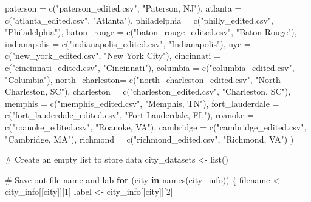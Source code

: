\documentclass[
  letterpaper,
  DIV=11,
  numbers=noendperiod]{scrartcl}
\newenvironment{Shaded}{\begin{snugshade}}{\end{snugshade}}
\newcommand{\AttributeTok}[1]{\textcolor[rgb]{0.40,0.45,0.13}{#1}}
\newcommand{\CommentTok}[1]{\textcolor[rgb]{0.37,0.37,0.37}{#1}}
\newcommand{\ControlFlowTok}[1]{\textcolor[rgb]{0.00,0.23,0.31}{\textbf{#1}}}
\newcommand{\DecValTok}[1]{\textcolor[rgb]{0.68,0.00,0.00}{#1}}
\newcommand{\FunctionTok}[1]{\textcolor[rgb]{0.28,0.35,0.67}{#1}}
\newcommand{\NormalTok}[1]{\textcolor[rgb]{0.00,0.23,0.31}{#1}}
\newcommand{\OtherTok}[1]{\textcolor[rgb]{0.00,0.23,0.31}{#1}}
\newcommand{\StringTok}[1]{\textcolor[rgb]{0.13,0.47,0.30}{#1}}
\begin{document}
\begin{Shaded}
\begin{Highlighting}[]
  \AttributeTok{paterson        =} \FunctionTok{c}\NormalTok{(}\StringTok{"paterson\_edited.csv"}\NormalTok{, }\StringTok{"Paterson, NJ"}\NormalTok{),}
  \AttributeTok{atlanta         =} \FunctionTok{c}\NormalTok{(}\StringTok{"atlanta\_edited.csv"}\NormalTok{, }\StringTok{"Atlanta"}\NormalTok{),}
  \AttributeTok{philadelphia    =} \FunctionTok{c}\NormalTok{(}\StringTok{"philly\_edited.csv"}\NormalTok{, }\StringTok{"Philadelphia"}\NormalTok{),}
  \AttributeTok{baton\_rouge     =} \FunctionTok{c}\NormalTok{(}\StringTok{"baton\_rouge\_edited.csv"}\NormalTok{, }\StringTok{"Baton Rouge"}\NormalTok{),}
  \AttributeTok{indianapolis    =} \FunctionTok{c}\NormalTok{(}\StringTok{"indianapolis\_edited.csv"}\NormalTok{, }\StringTok{"Indianapolis"}\NormalTok{),}
  \AttributeTok{nyc             =} \FunctionTok{c}\NormalTok{(}\StringTok{"new\_york\_edited.csv"}\NormalTok{, }\StringTok{"New York City"}\NormalTok{),}
  \AttributeTok{cincinnati      =} \FunctionTok{c}\NormalTok{(}\StringTok{"cincinnati\_edited.csv"}\NormalTok{, }\StringTok{"Cincinnati"}\NormalTok{),}
  \AttributeTok{columbia        =} \FunctionTok{c}\NormalTok{(}\StringTok{"columbia\_edited.csv"}\NormalTok{, }\StringTok{"Columbia"}\NormalTok{),}
  \AttributeTok{north\_charleston=} \FunctionTok{c}\NormalTok{(}\StringTok{"north\_charleston\_edited.csv"}\NormalTok{, }\StringTok{"North Charleston, SC"}\NormalTok{),}
  \AttributeTok{charleston      =} \FunctionTok{c}\NormalTok{(}\StringTok{"charleston\_edited.csv"}\NormalTok{, }\StringTok{"Charleston, SC"}\NormalTok{),}
  \AttributeTok{memphis         =} \FunctionTok{c}\NormalTok{(}\StringTok{"memphis\_edited.csv"}\NormalTok{, }\StringTok{"Memphis, TN"}\NormalTok{),}
  \AttributeTok{fort\_lauderdale =} \FunctionTok{c}\NormalTok{(}\StringTok{"fort\_lauderdale\_edited.csv"}\NormalTok{, }\StringTok{"Fort Lauderdale, FL"}\NormalTok{),}
  \AttributeTok{roanoke         =} \FunctionTok{c}\NormalTok{(}\StringTok{"roanoke\_edited.csv"}\NormalTok{, }\StringTok{"Roanoke, VA"}\NormalTok{),}
  \AttributeTok{cambridge       =} \FunctionTok{c}\NormalTok{(}\StringTok{"cambridge\_edited.csv"}\NormalTok{, }\StringTok{"Cambridge, MA"}\NormalTok{),}
  \AttributeTok{richmond        =} \FunctionTok{c}\NormalTok{(}\StringTok{"richmond\_edited.csv"}\NormalTok{, }\StringTok{"Richmond, VA"}\NormalTok{)}
\NormalTok{)}

\CommentTok{\# Create an empty list to store data}
\NormalTok{city\_datasets }\OtherTok{\textless{}{-}} \FunctionTok{list}\NormalTok{()}

\CommentTok{\# Save out file name and lab}
\ControlFlowTok{for}\NormalTok{ (city }\ControlFlowTok{in} \FunctionTok{names}\NormalTok{(city\_info)) \{}
\NormalTok{  filename }\OtherTok{\textless{}{-}}\NormalTok{ city\_info[[city]][}\DecValTok{1}\NormalTok{]}
\NormalTok{  label }\OtherTok{\textless{}{-}}\NormalTok{ city\_info[[city]][}\DecValTok{2}\NormalTok{]}
  

\end{Highlighting}
\end{Shaded}
\end{document}
